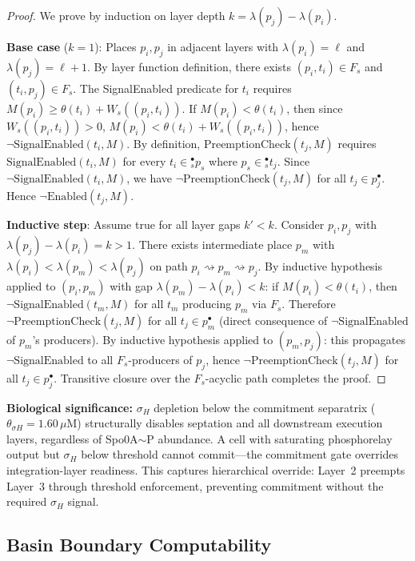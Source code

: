 \documentclass[10pt,letterpaper]{article}
\begin{document}
\begin{proof}
We prove by induction on layer depth $k = \lambda(p_j) - \lambda(p_i)$.

\textbf{Base case} ($k=1$): Places $p_i, p_j$ in adjacent layers with
$\lambda(p_i) = \ell$ and $\lambda(p_j) = \ell+1$.
By layer function definition, there exists $(p_i,t_i) \in F_s$ and
$(t_i,p_j) \in F_s$.
The SignalEnabled predicate for $t_i$ requires
$M(p_i) \geq \theta(t_i) + W_s((p_i,t_i))$.
If $M(p_i) < \theta(t_i)$, then since $W_s((p_i,t_i)) > 0$,
$M(p_i) < \theta(t_i) + W_s((p_i,t_i))$,
hence $\neg\text{SignalEnabled}(t_i,M)$.
By definition, $\text{PreemptionCheck}(t_j,M)$ requires
$\text{SignalEnabled}(t_i,M)$ for every $t_i \in {}^\bullet_s p_s$
where $p_s \in {}^\bullet_s t_j$.
Since $\neg\text{SignalEnabled}(t_i,M)$, we have
$\neg\text{PreemptionCheck}(t_j,M)$ for all $t_j \in p_j^\bullet$.
Hence $\neg\text{Enabled}(t_j,M)$.

\textbf{Inductive step}: Assume true for all layer gaps $k' < k$.
Consider $p_i, p_j$ with $\lambda(p_j) - \lambda(p_i) = k > 1$.
There exists intermediate place $p_m$ with
$\lambda(p_i) < \lambda(p_m) < \lambda(p_j)$ on path
$p_i \rightsquigarrow p_m \rightsquigarrow p_j$.
By inductive hypothesis applied to $(p_i,p_m)$ with gap
$\lambda(p_m)-\lambda(p_i) < k$: if $M(p_i) < \theta(t_i)$, then
$\neg\text{SignalEnabled}(t_m,M)$ for all $t_m$ producing $p_m$ via $F_s$.
Therefore $\neg\text{PreemptionCheck}(t_j,M)$ for all $t_j \in p_m^\bullet$
(direct consequence of $\neg\text{SignalEnabled}$ of $p_m$'s producers).
By inductive hypothesis applied to $(p_m,p_j)$: this propagates
$\neg\text{SignalEnabled}$ to all $F_s$-producers of $p_j$, hence
$\neg\text{PreemptionCheck}(t_j,M)$ for all $t_j \in p_j^\bullet$.
Transitive closure over the $F_s$-acyclic path completes the proof.
\end{proof}

\textbf{Biological significance:} $\sigma_H$ depletion below the commitment separatrix ($\theta_{\sigma H} = 1.60\,\mu$M) structurally disables septation and all downstream execution layers, regardless of Spo0A$\sim$P abundance. A cell with saturating phosphorelay output but $\sigma_H$ below threshold cannot commit---the commitment gate overrides integration-layer readiness. This captures hierarchical override: Layer~2 preempts Layer~3 through threshold enforcement, preventing commitment without the required $\sigma_H$ signal.

\subsection{Basin Boundary Computability}
\end{document}
